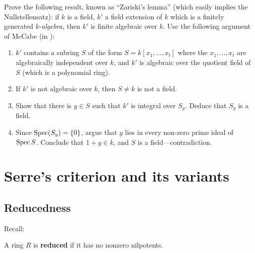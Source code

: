\begin{exercise} 
Prove the following result, known as ``Zariski's lemma'' (which easily implies
the Nullstellensatz): if $k$ is a field, $k'$ a field extension of $k$ which
is a finitely generated $k$-\emph{algebra}, then $k'$ is finite algebraic over
$k$. Use the following argument of McCabe (in \cite{Mc76}):
\begin{enumerate}
\item $k'$ contains a subring $S$ of the form $S= k[ x_1, \dots, x_t]$ where
the $x_1, \dots, x_t$ are algebraically independent over $k$, and $k'$ is
algebraic over the quotient field of $S$ (which is a polynomial ring). 
\item  If $k'$ is not algebraic over $k$, then $S \neq k$ is not a field.
\item Show that there is $y \in S$ such that $k'$ is integral over $S_y$.
Deduce that $S_y$ is a field.
\item Since $\operatorname{Spec} (S_y) = \left\{0\right\}$, argue that $y$ lies in every
non-zero prime ideal of $\operatorname{Spec} S$. Conclude that $1+y \in k$, and $S$ is a
field---contradiction.
\end{enumerate}
\end{exercise} 

\section{Serre's criterion and its variants}
\subsection{Reducedness}

Recall:

\begin{definition}
A ring $R$ is \textbf{reduced} if it has no nonzero nilpotents.
\end{definition}

